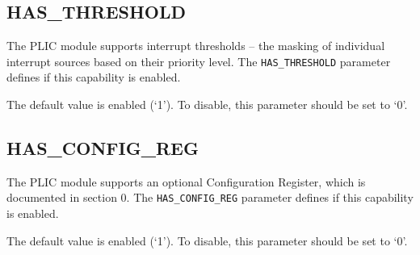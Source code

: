 \subsection{HAS\_THRESHOLD}

The PLIC module supports interrupt thresholds -- the masking of individual interrupt sources based on their priority level.
The \texttt{HAS\_THRESHOLD} parameter defines if this capability is enabled.

The default value is enabled (`1'). To disable, this parameter should be set to `0'.

\subsection{HAS\_CONFIG\_REG}

The PLIC module supports an optional Configuration Register, which is documented in section 0.
The \texttt{HAS\_CONFIG\_REG} parameter defines if this capability is enabled.

The default value is enabled (`1'). To disable, this parameter should be set to `0'.
